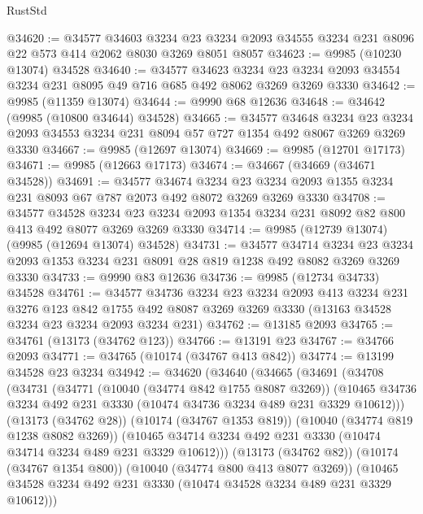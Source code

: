 \begin{lexlean}{RustStd}
\begin{coremodule}
@34620 := @34577
    @34603
    @3234
    @23
    @3234
    @2093
    @34555
    @3234
    @231
    @8096
    @22
    @573
    @414
    @2062
    @8030
    @3269
    @8051
    @8057
@34623 := @9985 (@10230 @13074) @34528
@34640 := @34577
    @34623
    @3234
    @23
    @3234
    @2093
    @34554
    @3234
    @231
    @8095
    @49
    @716
    @685
    @492
    @8062
    @3269
    @3269
    @3330
@34642 := @9985 (@11359 @13074)
@34644 := @9990 @68 @12636
@34648 := @34642 (@9985 (@10800 @34644) @34528)
@34665 := @34577
    @34648
    @3234
    @23
    @3234
    @2093
    @34553
    @3234
    @231
    @8094
    @57
    @727
    @1354
    @492
    @8067
    @3269
    @3269
    @3330
@34667 := @9985 (@12697 @13074)
@34669 := @9985 (@12701 @17173)
@34671 := @9985 (@12663 @17173)
@34674 := @34667 (@34669 (@34671 @34528))
@34691 := @34577
    @34674
    @3234
    @23
    @3234
    @2093
    @1355
    @3234
    @231
    @8093
    @67
    @787
    @2073
    @492
    @8072
    @3269
    @3269
    @3330
@34708 := @34577
    @34528
    @3234
    @23
    @3234
    @2093
    @1354
    @3234
    @231
    @8092
    @82
    @800
    @413
    @492
    @8077
    @3269
    @3269
    @3330
@34714 := @9985 (@12739 @13074) (@9985 (@12694 @13074) @34528)
@34731 := @34577
    @34714
    @3234
    @23
    @3234
    @2093
    @1353
    @3234
    @231
    @8091
    @28
    @819
    @1238
    @492
    @8082
    @3269
    @3269
    @3330
@34733 := @9990 @83 @12636
@34736 := @9985 (@12734 @34733) @34528
@34761 := @34577
    @34736
    @3234
    @23
    @3234
    @2093
    @413
    @3234
    @231
    @3276
    @123
    @842
    @1755
    @492
    @8087
    @3269
    @3269
    @3330
    (@13163 @34528 @3234 @23 @3234 @2093 @3234 @231)
@34762 := @13185 @2093
@34765 := @34761 (@13173 (@34762 @123))
@34766 := @13191 @23
@34767 := @34766 @2093
@34771 := @34765 (@10174 (@34767 @413 @842))
@34774 := @13199 @34528 @23 @3234
@34942 := @34620
    (@34640
      (@34665
        (@34691
          (@34708
            (@34731
              (@34771
                (@10040 (@34774 @842 @1755 @8087 @3269))
                (@10465 @34736 @3234 @492 @231 @3330 (@10474 @34736 @3234 @489 @231 @3329 @10612)))
              (@13173 (@34762 @28))
              (@10174 (@34767 @1353 @819))
              (@10040 (@34774 @819 @1238 @8082 @3269))
              (@10465 @34714 @3234 @492 @231 @3330 (@10474 @34714 @3234 @489 @231 @3329 @10612)))
            (@13173 (@34762 @82))
            (@10174 (@34767 @1354 @800))
            (@10040 (@34774 @800 @413 @8077 @3269))
            (@10465 @34528 @3234 @492 @231 @3330 (@10474 @34528 @3234 @489 @231 @3329 @10612)))

\end{coremodule}
\end{lexlean}
